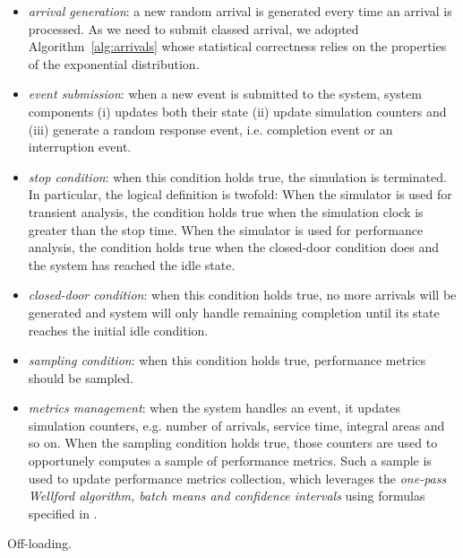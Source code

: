 \begin{itemize}
	
	\item \textit{arrival generation}: a new random arrival is generated every time an arrival is processed. As we need to submit classed arrival, we adopted Algorithm~\ref{alg:arrivals} whose statistical correctness relies on the properties of the exponential distribution.
	
	\item \textit{event submission}: when a new event is submitted to the system, system components (i) updates both their state (ii) update simulation counters and (iii) generate a random response event, i.e. completion event or an interruption event.
	
	\item \textit{stop condition}: when this condition holds true, the simulation is terminated. In particular, the logical definition is twofold:
	When the simulator is used for transient analysis, the condition holds true when the simulation clock is greater than the stop time.
	When the simulator is used for performance analysis, the condition holds true when the closed-door condition does and the system has reached the idle state.
	
	\item \textit{closed-door condition}: when this condition holds true, no more arrivals will be generated and system will only handle remaining completion until its state reaches the initial idle condition.
	
	\item \textit{sampling condition}: when this condition holds true, performance metrics should be sampled.
	
	\item \textit{metrics management}: when the system handles an event, it updates simulation counters, e.g. number of arrivals, service time, integral areas and so on. When the sampling condition holds true, those counters are used to opportunely computes a sample of performance metrics. Such a sample is used to update performance metrics collection, which leverages the \textit{one-pass Wellford algorithm, batch means and confidence intervals} using formulas specified in \cite{leemis2006discrete}.
\end{itemize}

\begin{algorithm}
	\SetAlgoLined
	\caption{Off-loading.}
	\label{alg:offloading-policy}
\end{algorithm}

